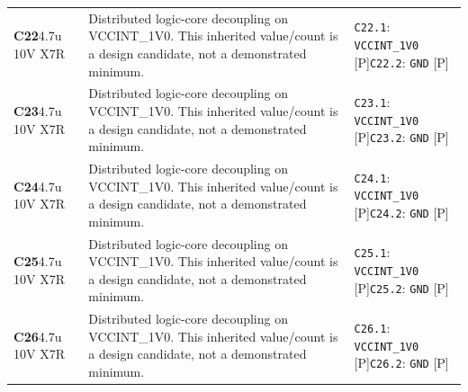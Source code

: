 \documentclass[11pt,a4paper]{article}
\begin{document}
\begin{longtable}{@{}P{27mm}P{83mm}P{58mm}@{}}
\textbf{C22}\newline 4.7u 10V X7R & Distributed logic-core decoupling on VCCINT\_1V0. This inherited value/count is a design candidate, not a demonstrated minimum. & \nolinkurl{C22.1}: \nolinkurl{VCCINT_1V0} [P]\newline \nolinkurl{C22.2}: \nolinkurl{GND} [P] \\
\textbf{C23}\newline 4.7u 10V X7R & Distributed logic-core decoupling on VCCINT\_1V0. This inherited value/count is a design candidate, not a demonstrated minimum. & \nolinkurl{C23.1}: \nolinkurl{VCCINT_1V0} [P]\newline \nolinkurl{C23.2}: \nolinkurl{GND} [P] \\
\textbf{C24}\newline 4.7u 10V X7R & Distributed logic-core decoupling on VCCINT\_1V0. This inherited value/count is a design candidate, not a demonstrated minimum. & \nolinkurl{C24.1}: \nolinkurl{VCCINT_1V0} [P]\newline \nolinkurl{C24.2}: \nolinkurl{GND} [P] \\
\textbf{C25}\newline 4.7u 10V X7R & Distributed logic-core decoupling on VCCINT\_1V0. This inherited value/count is a design candidate, not a demonstrated minimum. & \nolinkurl{C25.1}: \nolinkurl{VCCINT_1V0} [P]\newline \nolinkurl{C25.2}: \nolinkurl{GND} [P] \\
\textbf{C26}\newline 4.7u 10V X7R & Distributed logic-core decoupling on VCCINT\_1V0. This inherited value/count is a design candidate, not a demonstrated minimum. & \nolinkurl{C26.1}: \nolinkurl{VCCINT_1V0} [P]\newline \nolinkurl{C26.2}: \nolinkurl{GND} [P] \\

\end{longtable}
\end{document}
